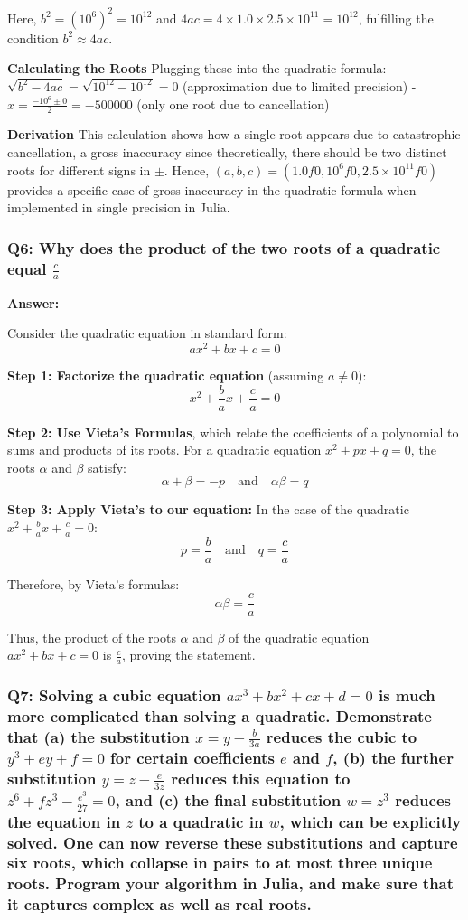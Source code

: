 \documentclass{article}
\begin{document}
Here, \( b^2 = (10^6)^2 = 10^{12} \) and \( 4ac = 4 \times 1.0 \times 2.5 \times 10^{11} = 10^{12} \), fulfilling the condition \( b^2 \approx 4ac \).

\textbf{Calculating the Roots}
Plugging these into the quadratic formula:
- \( \sqrt{b^2 - 4ac} = \sqrt{10^{12} - 10^{12}} = 0 \) (approximation due to limited precision)
- \( x = \frac{-10^6 \pm 0}{2} = -500000 \) (only one root due to cancellation)

\textbf{Derivation}
This calculation shows how a single root appears due to catastrophic cancellation, a gross inaccuracy since theoretically, there should be two distinct roots for different signs in $\pm$. Hence, $(a, b, c) = (1.0f0, 10^6f0, 2.5 \times 10^{11}f0)$ provides a specific case of gross inaccuracy in the quadratic formula when implemented in single precision in Julia. \\



 \subsubsection*{Q6: Why does the product of the two roots of a quadratic equal $\frac{c}{a}$}

\textbf{Answer:}

Consider the quadratic equation in standard form:
\[ ax^2 + bx + c = 0 \]

\textbf{Step 1: Factorize the quadratic equation }(assuming \(a \neq 0\)):
\[ x^2 + \frac{b}{a}x + \frac{c}{a} = 0 \]

\textbf{Step 2: Use Vieta's Formulas}, which relate the coefficients of a polynomial to sums and products of its roots. For a quadratic equation \(x^2 + px + q = 0\), the roots \(\alpha\) and \(\beta\) satisfy:
\[ \alpha + \beta = -p \quad \text{and} \quad \alpha\beta = q \]

\textbf{Step 3: Apply Vieta's to our equation:}
In the case of the quadratic \(x^2 + \frac{b}{a}x + \frac{c}{a} = 0\):
\[ p = \frac{b}{a} \quad \text{and} \quad q = \frac{c}{a} \]

Therefore, by Vieta's formulas:
\[ \alpha\beta = \frac{c}{a} \]

Thus, the product of the roots \(\alpha\) and \(\beta\) of the quadratic equation \(ax^2 + bx + c = 0\) is \(\frac{c}{a}\), proving the statement.

\subsubsection*{Q7: Solving a cubic equation $ax^3 + bx^2 + cx + d = 0$ is much more complicated than solving a quadratic. Demonstrate that (a) the substitution $x = y - \frac{b}{3a}$ reduces the cubic to $y^3 + ey + f = 0$ for certain coefficients $e$ and $f$, (b) the further substitution $y = z - \frac{e}{3z}$ reduces this equation to $z^6 + fz^3 - \frac{e^3}{27} = 0$, and (c) the final substitution $w = z^3$ reduces the equation in $z$ to a quadratic in $w$, which can be explicitly solved. One can now reverse these substitutions and capture six roots, which collapse in pairs to at most three unique roots. Program your algorithm in Julia, and make sure that it captures complex as well as real roots.}
\end{document}

